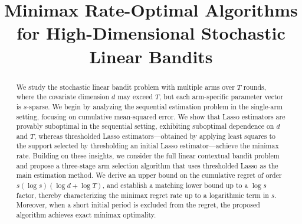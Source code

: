 \documentclass[aos,preprint]{imsart}
\theoremstyle{plain}
\theoremstyle{definition}
\begin{document}
\begin{frontmatter}
\title{Minimax Rate-Optimal Algorithms for High-Dimensional Stochastic Linear Bandits}
\runtitle{}

\begin{aug}
\author{~}
\and
\author{\fnms{Yanglei}~\snm{Song}\ead[label=e2]{yanglei.song@queensu.ca}}
\address{Department of Mathematics and Statistics, Queen's University }

\address{\printead[presep={\ }]{e1,e2}}
\end{aug}

\begin{abstract}
We study the stochastic linear bandit problem with multiple arms over $T$ rounds, where the covariate dimension $d$ may exceed $T$, but each arm-specific parameter vector is $s$-sparse. We begin by analyzing the sequential estimation problem in the single-arm setting, focusing on cumulative mean-squared error. We show that Lasso estimators are provably suboptimal in the sequential setting, exhibiting suboptimal dependence on $d$ and $T$, whereas thresholded Lasso estimators---obtained by applying least squares to the support selected by thresholding an initial Lasso estimator---achieve the minimax rate. Building on these insights, we consider the full linear contextual bandit problem and propose a three-stage arm selection algorithm that uses thresholded Lasso as the main estimation method. We derive an upper bound on the cumulative regret of order $s(\log s)(\log d + \log T)$, and establish a matching lower bound up to a $\log s$ factor, thereby characterizing the minimax regret rate up to a logarithmic term in $s$. Moreover, when a short initial period is excluded from the regret, the proposed algorithm achieves exact minimax optimality.
\end{abstract}


\end{frontmatter}
\end{document}
